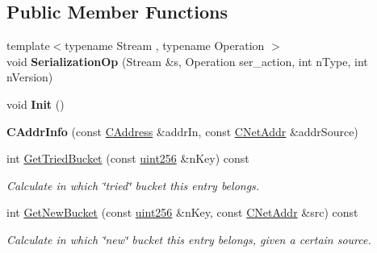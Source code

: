 \subsection*{Public Member Functions}
\begin{DoxyCompactItemize}
\item 
\mbox{\label{class_c_addr_info_ae80fdec7d3b48278033ea2280f66e68b}} 
{\footnotesize template$<$typename Stream , typename Operation $>$ }\\void {\bfseries Serialization\+Op} (Stream \&s, Operation ser\+\_\+action, int n\+Type, int n\+Version)
\item 
\mbox{\label{class_c_addr_info_af1df1f12bc71ed7f3debae61058b9b9f}} 
void {\bfseries Init} ()
\item 
\mbox{\label{class_c_addr_info_a27e773233e8d7e7d183f138d24cc40ef}} 
{\bfseries C\+Addr\+Info} (const \mbox{\hyperlink{class_c_address}{C\+Address}} \&addr\+In, const \mbox{\hyperlink{class_c_net_addr}{C\+Net\+Addr}} \&addr\+Source)
\item 
\mbox{\label{class_c_addr_info_a11e2712f11c0d92c75976e90f2c5003e}} 
int \mbox{\hyperlink{class_c_addr_info_a11e2712f11c0d92c75976e90f2c5003e}{Get\+Tried\+Bucket}} (const \mbox{\hyperlink{classuint256}{uint256}} \&n\+Key) const
\begin{DoxyCompactList}\small\item\em Calculate in which \char`\"{}tried\char`\"{} bucket this entry belongs. \end{DoxyCompactList}\item 
\mbox{\label{class_c_addr_info_ae4459cd7719834bbcf77874757c6875e}} 
int \mbox{\hyperlink{class_c_addr_info_ae4459cd7719834bbcf77874757c6875e}{Get\+New\+Bucket}} (const \mbox{\hyperlink{classuint256}{uint256}} \&n\+Key, const \mbox{\hyperlink{class_c_net_addr}{C\+Net\+Addr}} \&src) const
\begin{DoxyCompactList}\small\item\em Calculate in which \char`\"{}new\char`\"{} bucket this entry belongs, given a certain source. \end{DoxyCompactList}\item 
\mbox{\label{class_c_addr_info_a04ac79764971242edce1e82aefb2aea0}} 

\end{DoxyCompactItemize}
